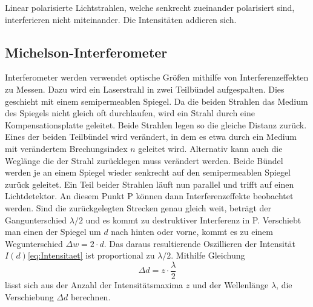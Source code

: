 Linear polarisierte Lichtstrahlen, welche senkrecht zueinander polarisiert sind, 
interferieren nicht miteinander. Die Intensitäten addieren sich.

\subsection{Michelson-Interferometer}
\label{sec:Michelson-Interferometer}

Interferometer werden verwendet optische Größen mithilfe von Interferenzeffekten zu Messen.
Dazu wird ein Laserstrahl in zwei Teilbündel aufgespalten. 
Dies geschieht mit einem semipermeablen Spiegel. 
Da die beiden Strahlen das Medium des Spiegels nicht gleich oft durchlaufen, wird
ein Strahl durch eine Kompensationsplatte geleitet. Beide Strahlen legen so die gleiche Distanz zurück.
Eines der beiden Teilbündel wird verändert, in dem es etwa durch ein Medium mit verändertem Brechungsindex $n$
geleitet wird. Alternativ kann auch die Weglänge die der Strahl zurücklegen muss verändert werden.
Beide Bündel werden je an einem Spiegel wieder senkrecht auf den semipermeablen Spiegel zurück geleitet.
Ein Teil beider Strahlen läuft nun parallel und trifft auf einen Lichtdetektor.
An diesem Punkt P können dann Interferenzeffekte beobachtet werden.
Sind die zurückgelegten Strecken genau gleich weit, beträgt der Gangunterschied $λ/2$
und es kommt zu destruktiver Interferenz in P.
Verschiebt man einen der Spiegel um $d$ nach hinten oder vorne, kommt es zu einem Wegunterschied
$Δw = 2 \cdot d.$ Das daraus resultierende Oszillieren der Intensität $I(d)$\ref*{eq:Intensitaet}
ist proportional zu $λ/2.$ Mithilfe Gleichung 
\begin{equation*}
    Δd = z \cdot \frac{λ}{2}
\end{equation*}
lässt sich aus der Anzahl der Intensitätsmaxima $z$ und der Wellenlänge $λ$, die Verschiebung $Δd$ berechnen.

